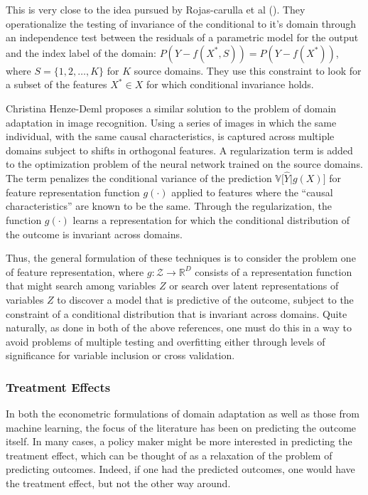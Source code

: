 \documentclass[a4paper,12pt]{article}
\begin{document}
This is very close to the idea pursued by Rojas-carulla et al (\cite{Rojas-carulla2018}). They operationalize the testing of invariance of the conditional to it's domain through an independence test between the residuals of a parametric model for the output and the index label of the domain: $P(Y - f(X^*, S)) = P(Y - f(X^*))$, where $S = \{1,2,\ldots,K \}$ for $K$ source domains. They use this constraint to look for a subset of the features $X^* \in X$ for which conditional invariance holds.

Christina Henze-Deml \parencite*{Heinze-deml2017} proposes a similar solution to the problem of domain adaptation in image recognition. Using a series of images in which the same individual, with the same causal characteristics, is captured across multiple domains subject to shifts in orthogonal features. A regularization term is added to the optimization problem of the neural network trained on the source domains. The term penalizes the conditional variance of the prediction $\mathbb{V}\big[ \hat{Y}| g(X) \big]$ for feature representation function $g(\cdot)$ applied to features where the ``causal characteristics'' are known to be the same. Through the regularization, the function $g(\cdot)$ learns a representation for which the conditional distribution of the outcome is invariant across domains.

Thus, the general formulation of these techniques is to consider the problem one of feature representation, where $g: \mathcal{Z} \rightarrow \mathbb{R}^D$ consists of a representation function that might search among variables $Z$ or search over latent representations of variables $Z$ to discover a model that is predictive of the outcome, subject to the constraint of a conditional distribution that is invariant across domains. Quite naturally, as done in both of the above references, one must do this in a way to avoid problems of multiple testing and overfitting either through levels of significance for variable inclusion or cross validation.

\subsubsection{Treatment Effects}

In both the econometric formulations of domain adaptation as well as those from machine learning, the focus of the literature has been on predicting the outcome itself. In many cases, a policy maker might be more interested in predicting the treatment effect, which can be thought of as a relaxation of the problem of predicting outcomes. Indeed, if one had the predicted outcomes, one would have the treatment effect, but not the other way around.
\end{document}
